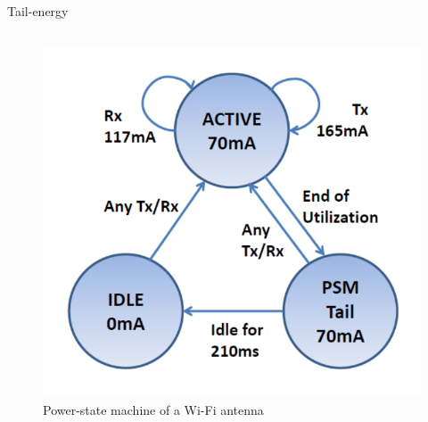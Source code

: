 \begin{frame}{Tail-energy}
\begin{columns}
\begin{column}{0.5\textwidth}
\begin{figure}
	\centering
	\includegraphics[width=\textwidth]{figures/wifi_statemachine.png} 
	\caption{Power-state machine of a Wi-Fi antenna}
\end{figure}
\end{column}
\end{columns}
\end{frame}
%
%

